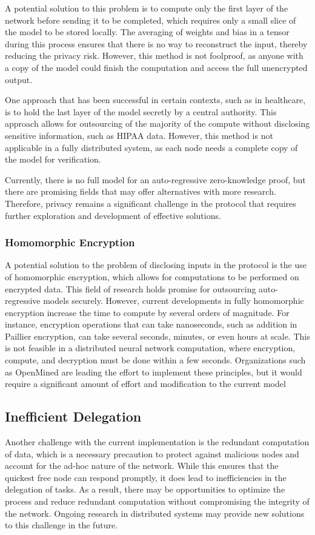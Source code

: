 \documentclass{article}
\begin{document}
A potential solution to this problem is to compute only the first layer of the network before sending it to be completed, which requires only a small slice of the model to be stored locally. 
The averaging of weights and bias in a tensor during this process ensures that there is no way to reconstruct the input, thereby reducing the privacy risk. 
However, this method is not foolproof, as anyone with a copy of the model could finish the computation and access the full unencrypted output.

One approach that has been successful in certain contexts, such as in healthcare, is to hold the last layer of the model secretly by a central authority. 
This approach allows for outsourcing of the majority of the compute without disclosing sensitive information, such as HIPAA data. 
However, this method is not applicable in a fully distributed system, as each node needs a complete copy of the model for verification.

Currently, there is no full model for an auto-regressive zero-knowledge proof, but there are promising fields that may offer alternatives with more research. 
Therefore, privacy remains a significant challenge in the protocol that requires further exploration and development of effective solutions.
\subsubsection{Homomorphic Encryption}
A potential solution to the problem of disclosing inputs in the protocol is the use of homomorphic encryption, which allows for computations to be performed on encrypted data. 
This field of research holds promise for outsourcing auto-regressive models securely. 
However, current developments in fully homomorphic encryption increase the time to compute by several orders of magnitude. 
For instance, encryption operations that can take nanoseconds, such as addition in Paillier encryption, can take several seconds, minutes, or even hours at scale. 
This is not feasible in a distributed neural network computation, where encryption, compute, and decryption must be done within a few seconds. 
Organizations such as OpenMined are leading the effort to implement these principles, but it would require a significant amount of effort and modification to the current model
\subsection{Inefficient Delegation}
Another challenge with the current implementation is the redundant computation of data, which is a necessary precaution to protect against malicious nodes and account for the ad-hoc nature of the network. 
While this ensures that the quickest free node can respond promptly, it does lead to inefficiencies in the delegation of tasks. 
As a result, there may be opportunities to optimize the process and reduce redundant computation without compromising the integrity of the network. Ongoing research in distributed systems may provide new solutions to this challenge in the future.
\end{document}
